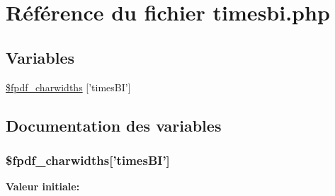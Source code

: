 \hypertarget{timesbi_8php}{
\section{R\'{e}f\'{e}rence du fichier timesbi.php}
\label{timesbi_8php}
}
\subsection*{Variables}
\begin{CompactItemize}
\item 
\hyperlink{timesbi_8php_a0}{\$fpdf\_\-charwidths} \mbox{[}'times\-BI'\mbox{]}
\end{CompactItemize}


\subsection{Documentation des variables}
\hypertarget{timesbi_8php_a0}{
\subsubsection[\$fpdf\_\-charwidths]{\setlength{\rightskip}{0pt plus 5cm}\$fpdf\_\-charwidths\mbox{[}'times\-BI'\mbox{]}}}
\label{timesbi_8php_a0}


{\bf Valeur initiale:}

